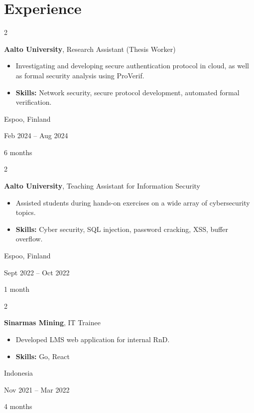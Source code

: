 \documentclass[10pt, a4paper]{article}
\newenvironment{highlights}{
    \begin{itemize}[
        topsep=0.10 cm,
        parsep=0.10 cm,
        partopsep=0pt,
        itemsep=0pt,
        leftmargin=0 cm + 10pt
    ]
}{
    \end{itemize}
} %
\newenvironment{twocolentry}[2][]{
    \onecolentry
    \def\secondColumn{#2}
    \setcolumnwidth{\fill, 3 cm}
    \begin{paracol}{2}
}{
    \switchcolumn \raggedleft \secondColumn
    \end{paracol}
    \endonecolentry
} %
\begin{document}
    
    \section{Experience}



        
        \begin{twocolentry}{
            Espoo, Finland

        Feb 2024 – Aug 2024

        6 months
        }
            \textbf{Aalto University}, Research Assistant (Thesis Worker)
            \begin{highlights}
                \item Investigating and developing secure authentication protocol in cloud, as well as formal security analysis using ProVerif.
                \item \textbf{Skills:} Network security, secure protocol development, automated formal verification.
            \end{highlights}
        \end{twocolentry}


        \vspace{0.2 cm}

        \begin{twocolentry}{
            Espoo, Finland

        Sept 2022 – Oct 2022

        1 month
        }
            \textbf{Aalto University}, Teaching Assistant for Information Security
            \begin{highlights}
                \item Assisted students during hands-on exercises on a wide array of cybersecurity topics.
                \item \textbf{Skills:} Cyber security, SQL injection, password cracking, XSS, buffer overflow.
            \end{highlights}
        \end{twocolentry}


        \vspace{0.2 cm}

        \begin{twocolentry}{
            Indonesia

        Nov 2021 – Mar 2022

        4 months
        }
            \textbf{Sinarmas Mining}, IT Trainee
            \begin{highlights}
                \item Developed LMS web application for internal RnD.
                \item \textbf{Skills:} Go, React
            \end{highlights}
        \end{twocolentry}
\end{document}
